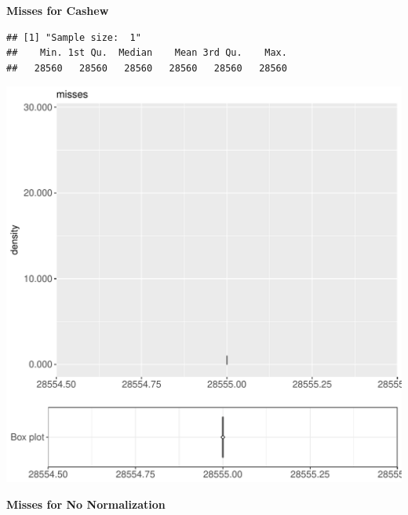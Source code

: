 \documentclass{article}\usepackage[]{graphicx}\usepackage[]{color}
\makeatletter
\def\maxwidth{ %
  \ifdim\Gin@nat@width>\linewidth
    \linewidth
  \else
    \Gin@nat@width
  \fi
}
\newenvironment{kframe}{%
 \def\at@end@of@kframe{}%
 \ifinner\ifhmode%
  \def\at@end@of@kframe{\end{minipage}}%
  \begin{minipage}{\columnwidth}%
 \fi\fi%
 \def\FrameCommand##1{\hskip\@totalleftmargin \hskip-\fboxsep
 \colorbox{shadecolor}{##1}\hskip-\fboxsep
     \hskip-\linewidth \hskip-\@totalleftmargin \hskip\columnwidth}%
 \MakeFramed {\advance\hsize-\width
   \@totalleftmargin\z@ \linewidth\hsize
   \@setminipage}}%
 {\par\unskip\endMakeFramed%
 \at@end@of@kframe}
\newenvironment{knitrout}{}{} %
\makeatother
\begin{document}
 \textbf{Misses for Cashew}
\begin{knitrout}
\color{fgcolor}\begin{kframe}
\begin{verbatim}
## [1] "Sample size:  1"
##    Min. 1st Qu.  Median    Mean 3rd Qu.    Max. 
##   28560   28560   28560   28560   28560   28560
\end{verbatim}


{\ttfamily\noindent\bfseries{}}\end{kframe}
\includegraphics[width=\maxwidth]{figure/RH4_cashew_obscure-1} 

\end{knitrout}
 \textbf{Misses for No Normalization}
\end{document}
